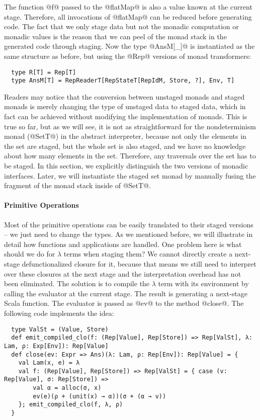 The function @f@ passed to the @flatMap@ is also a value known at the current stage.
Therefore, all invocations of @flatMap@ can be reduced before generating code.
The fact that we only stage data but not the monadic computation or monadic
values is the reason that we can peel of the monad stack in the generated code
through staging.  Now the type @AnsM[_]@ is instantiated as the same structure
as before, but using the @Rep@ versions of monad transformers:
\begin{lstlisting}
  type R[T] = Rep[T]
  type AnsM[T] = RepReaderT[RepStateT[RepIdM, Store, ?], Env, T]
\end{lstlisting}

Readers may notice that the conversion between unstaged monads and staged monads
is merely changing the type of unstaged data to staged data, which in fact can
be achieved without modifying the implementation of monads. This is true so far,
but as we will see, it is not as straightforward for the nondeterminism monad
(@SetT@) in the abstract interpreter, because not only the elements in the set are
staged, but the whole set is also staged, and we have no knowledge about how
many elements in the set. Therefore, any traversals over the set has to be
staged.  In this section, we explicitly distinguish the two versions of monadic
interfaces. Later, we will instantiate the staged set monad by manually fusing
the fragment of the monad stack inside of @SetT@.

\paragraph{Primitive Operations} Most of the primitive operations can be easily
translated to their staged versions -- we just need to change the types.  As we
mentioned before, we will illustrate in detail how functions and applications
are handled.  One problem here is what should we do for $\lambda$ terms when
staging them? We cannot directly create a next-stage defunctionalized closure
for it, because that means we still need to interpret over these closures at the
next stage and the interpretation overhead has not been eliminated. 
The solution is to compile the $\lambda$ term with its environment by calling
the evaluator at the current stage. The result is generating a next-stage
Scala function. The evaluator is passed as @ev@ to the method @close@.
The following code implements the idea:
\begin{lstlisting}
  type ValSt = (Value, Store)
  def emit_compiled_clo(f: (Rep[Value], Rep[Store]) => Rep[ValSt], λ: Lam, ρ: Exp[Env]): Rep[Value]
  def close(ev: Expr => Ans)(λ: Lam, ρ: Rep[Env]): Rep[Value] = {
    val Lam(x, e) = λ
    val f: (Rep[Value], Rep[Store]) => Rep[ValSt] = { case (v: Rep[Value], σ: Rep[Store]) =>
        val α = alloc(σ, x)
        ev(e)(ρ + (unit(x) → α))(σ + (α → v))
    }; emit_compiled_clo(f, λ, ρ)
  }
\end{lstlisting}


